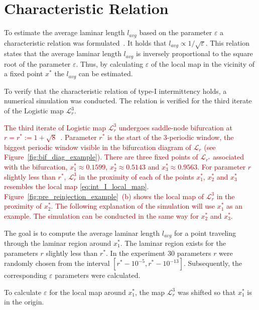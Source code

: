 \section{Characteristic Relation}
To estimate the average laminar length $l_{avg}$ based on the parameter $\varepsilon$ a characteristic relation was formulated~\cite{Elaskar2017}.
It holds that $l_{avg} \propto 1/\sqrt{\varepsilon}$.
This relation states that the average laminar length $l_{avg}$ is inversely proportional to the square root of the parameter $\varepsilon$.
Thus, by calculating $\varepsilon$ of the local map in the vicinity of a fixed point $x^{*}$ the $l_{avg}$ can be estimated.
\par
To verify that the characteristic relation of type-I intermittency holds, a numerical simulation was conducted.
The relation is verified for the third iterate of the Logistic map $\mathcal{L}_{r}^{3}$.
\par
\textcolor{darkred}{
The third iterate of Logistic map $\mathcal{L}_{r}^{3}$ undergoes saddle-node bifurcation at $r = r^{*} := 1+\sqrt{8}$~\cite{Elaskar2022,Gordon20180411}.
Parameter $r^{*}$ is the start of the $3$-periodic window, the biggest periodic window visible in the bifurcation diagram of $\mathcal{L}_{r}$ (see Figure~\ref{fig:bif_diag_example}).
There are three fixed points of $\mathcal{L}_{r^{*}}$ associated with the bifurcation, $x^{*}_{1} \approx 0.1599$, $x^{*}_{2} \approx 0.5143$ and $x^{*}_{3} \approx 0.9563$.
For parameter $r$ slightly less than $r^{*}$, $\mathcal{L}_{r}^{3}$ in the proximity of each of the points $x^{*}_{1}$, $x^{*}_{2}$ and $x^{*}_{3}$ resembles the local map \eqref{eq:int_I_local_map}.
Figure~\ref{fig:pre_reinjection_example}~(b) shows the local map of $\mathcal{L}_{r}^{3}$ in the proximity of $x^{*}_{2}$.
The following explanation of the simulation will use $x^{*}_{1}$ as an example.
The simulation can be conducted in the same way for $x^{*}_{2}$ and $x^{*}_{3}$.
}
\par
The goal is to compute the average laminar length $l_{avg}$ for a point traveling through the laminar region around $x^{*}_{1}$.
The laminar region exists for the parameters $r$ slightly less than $r^{*}$.
In the experiment $30$ parameters $r$ were randomly chosen from the interval $[ r^{*}-10^{-5}, r^{*}-10^{-13} ]$.
Subsequently, the corresponding $\varepsilon$ parameters were calculated.
\par
To calculate $\varepsilon$ for the local map around $x^{*}_{1}$, the map $\mathcal{L}_{r}^{3}$ was shifted so that $x^{*}_{1}$ is in the origin.
